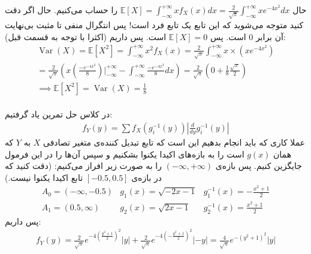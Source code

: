 حال
$\mathbb{E}[X] = \int_{-\infty}^{+\infty} x f_X(x) dx = \frac{2}{\sqrt{\pi}} \int_{-\infty}^{+\infty} x e^{-4x^2} dx$
را حساب می‌کنیم.
حال اگر دقت کنید متوجه می‌شوید که این تابع یک تابع فرد است! پس انتگرال منفی تا مثبت بی‌نهایت آن برابر 0 است.
پس
$\mathbb{E}[X] = 0$
است. پس داریم (اکثرا با توجه به قسمت قبل):
\begin{gather*}
    \operatorname{Var}(X) = \mathbb{E}[X^2] = \int_{-\infty}^{+\infty} x^2 f_X(x)
    = \frac{2}{\sqrt{\pi}} \int_{-\infty}^{+\infty} x \times (x e^{-4x^2})\\
    = \frac{2}{\sqrt{\pi}} (x (\frac{-e^{-4x^2}}{8}) \big |_{-\infty}^{+\infty} - \int_{-\infty}^{+\infty} \frac{-e^{-4x^2}}{8} dx)
    = \frac{2}{\sqrt{\pi}} (0 + \frac{1}{8} \frac{\sqrt{\pi}}{2})\\
    \implies \mathbb{E}[X^2] = \operatorname{Var}(X) = \frac{1}{8}
\end{gather*}
\\
در کلاس حل تمرین یاد گرفتیم:
\begin{gather*}
    f_Y(y) = \sum f_X(g_i^{-1}(y)) |\frac{d}{dy} g_i^{-1}(y)|
\end{gather*}
عملا کاری که باید انجام بدهیم این است که تابع تبدیل کننده‌ی متغیر تصادفی
$X$ به $Y$
که همان
$g(x)$
است را به بازه‌های اکیدا یکنوا بشکنیم و سپس آن‌ها را در این فرمول جایگزین کنیم.
پس بازه‌ی
$(-\infty, +\infty)$
را به صورت زیر افراز می‌کنیم:
(دقت کنید که در بازه‌ی
$[-0.5, 0.5]$
تابع اکیدا یکنوا نیست.)
\[
    \begin{array}{lll}
       A_0 = (-\infty, -0.5) & g_1(x) = \sqrt{-2x - 1} & g_1^{-1}(x) = -\frac{x^2 + 1}{2}\\
       A_1 = (0.5, \infty) & g_2(x) = \sqrt{2x - 1}  & g_2^{-1}(x) = \frac{x^2 + 1}{2}
    \end{array}
\]
پس داریم:
\begin{gather*}
    f_Y(y) = \frac{2}{\sqrt{\pi}}e^{-4(\frac{y^2 + 1}{2})^2} |y|
    + \frac{2}{\sqrt{\pi}}e^{-4(-\frac{y^2 + 1}{2})^2} |-y|
    = \frac{4}{\sqrt{\pi}}e^{-(y^2 + 1)^2} |y|
\end{gather*}


